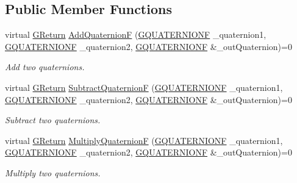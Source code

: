 \subsection*{Public Member Functions}
\begin{DoxyCompactItemize}
\item 
virtual \mbox{\hyperlink{namespace_g_w_a67a839e3df7ea8a5c5686613a7a3de21}{G\+Return}} \mbox{\hyperlink{class_g_w_1_1_m_a_t_h_1_1_g_quaternion_a8022f790af2feae15bc99c753b5578fe}{Add\+QuaternionF}} (\mbox{\hyperlink{struct_g_w_1_1_m_a_t_h_1_1_g_q_u_a_t_e_r_n_i_o_n_f}{G\+Q\+U\+A\+T\+E\+R\+N\+I\+O\+NF}} \+\_\+quaternion1, \mbox{\hyperlink{struct_g_w_1_1_m_a_t_h_1_1_g_q_u_a_t_e_r_n_i_o_n_f}{G\+Q\+U\+A\+T\+E\+R\+N\+I\+O\+NF}} \+\_\+quaternion2, \mbox{\hyperlink{struct_g_w_1_1_m_a_t_h_1_1_g_q_u_a_t_e_r_n_i_o_n_f}{G\+Q\+U\+A\+T\+E\+R\+N\+I\+O\+NF}} \&\+\_\+out\+Quaternion)=0
\begin{DoxyCompactList}\small\item\em Add two quaternions. \end{DoxyCompactList}\item 
virtual \mbox{\hyperlink{namespace_g_w_a67a839e3df7ea8a5c5686613a7a3de21}{G\+Return}} \mbox{\hyperlink{class_g_w_1_1_m_a_t_h_1_1_g_quaternion_a73e2c8974e1b6b87624763e59b6af801}{Subtract\+QuaternionF}} (\mbox{\hyperlink{struct_g_w_1_1_m_a_t_h_1_1_g_q_u_a_t_e_r_n_i_o_n_f}{G\+Q\+U\+A\+T\+E\+R\+N\+I\+O\+NF}} \+\_\+quaternion1, \mbox{\hyperlink{struct_g_w_1_1_m_a_t_h_1_1_g_q_u_a_t_e_r_n_i_o_n_f}{G\+Q\+U\+A\+T\+E\+R\+N\+I\+O\+NF}} \+\_\+quaternion2, \mbox{\hyperlink{struct_g_w_1_1_m_a_t_h_1_1_g_q_u_a_t_e_r_n_i_o_n_f}{G\+Q\+U\+A\+T\+E\+R\+N\+I\+O\+NF}} \&\+\_\+out\+Quaternion)=0
\begin{DoxyCompactList}\small\item\em Subtract two quaternions. \end{DoxyCompactList}\item 
virtual \mbox{\hyperlink{namespace_g_w_a67a839e3df7ea8a5c5686613a7a3de21}{G\+Return}} \mbox{\hyperlink{class_g_w_1_1_m_a_t_h_1_1_g_quaternion_ad63c0c42b4c60910e40dbcedb497d4d0}{Multiply\+QuaternionF}} (\mbox{\hyperlink{struct_g_w_1_1_m_a_t_h_1_1_g_q_u_a_t_e_r_n_i_o_n_f}{G\+Q\+U\+A\+T\+E\+R\+N\+I\+O\+NF}} \+\_\+quaternion1, \mbox{\hyperlink{struct_g_w_1_1_m_a_t_h_1_1_g_q_u_a_t_e_r_n_i_o_n_f}{G\+Q\+U\+A\+T\+E\+R\+N\+I\+O\+NF}} \+\_\+quaternion2, \mbox{\hyperlink{struct_g_w_1_1_m_a_t_h_1_1_g_q_u_a_t_e_r_n_i_o_n_f}{G\+Q\+U\+A\+T\+E\+R\+N\+I\+O\+NF}} \&\+\_\+out\+Quaternion)=0
\begin{DoxyCompactList}\small\item\em Multiply two quaternions. \end{DoxyCompactList}\item 

\end{DoxyCompactItemize}
